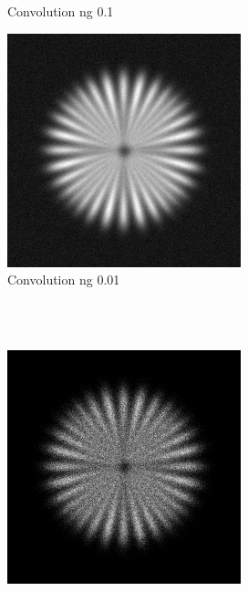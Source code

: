 \documentclass{./packages/optica-article}
\begin{document}
\begin{figure}[hbp]
\begin{center}
\begin{subfigure}[t]{0.25\textwidth}
			\caption{Convolution ng 0.1}\label{fig:sim:ng0.1}
		\end{subfigure}
		\hfill
		\begin{subfigure}[t]{0.25\textwidth}\centering
			\centering
			\includegraphics[width=\textwidth]{Simulation deconvolution/ref_ng_0.01}
			\caption{Convolution ng 0.01}\label{fig:sim:ng0.01}
		\end{subfigure}
		\hfill\,
		\\
		\hfill\,
		\begin{subfigure}[t]{0.25\textwidth}\centering
			\centering
			\includegraphics[width=\textwidth]{Simulation deconvolution/ref_np_0.01}

\end{subfigure}
\end{center}
\end{figure}
\end{document}
